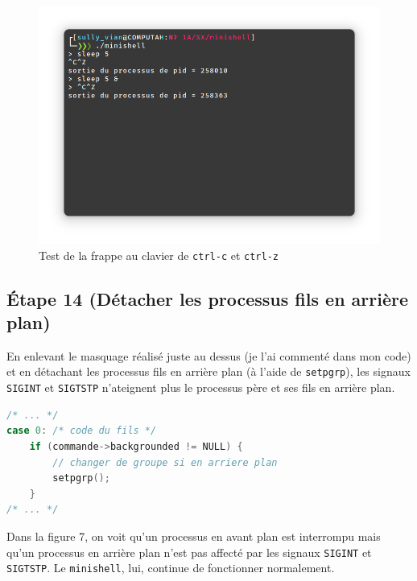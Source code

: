 \documentclass{article}
\begin{document}
\begin{figure}[H]
    \centering
    \includegraphics[width=\textwidth]{./resources/E13.3.png}
    \caption{Test de la frappe au clavier de \texttt{ctrl-c} et \texttt{ctrl-z}}
\end{figure}

\subsection*{Étape 14 (Détacher les processus fils en arrière plan)}

En enlevant le masquage réalisé juste au dessus (je l'ai commenté dans mon code) et en détachant les processus fils en arrière plan (à l'aide de \texttt{setpgrp}), les signaux \texttt{SIGINT} et \texttt{SIGTSTP} n'ateignent plus le processus père et ses fils en arrière plan.

\begin{lstlisting}[language=C, caption=ajout de la question 14]
/* ... */
case 0: /* code du fils */
    if (commande->backgrounded != NULL) {
        // changer de groupe si en arriere plan
        setpgrp();
    }
/* ... */
\end{lstlisting}

Dans la figure 7, on voit qu'un processus en avant plan est interrompu mais qu'un processus en arrière plan n'est pas affecté par les signaux \texttt{SIGINT} et \texttt{SIGTSTP}. Le \texttt{minishell}, lui, continue de fonctionner normalement.
\end{document}
